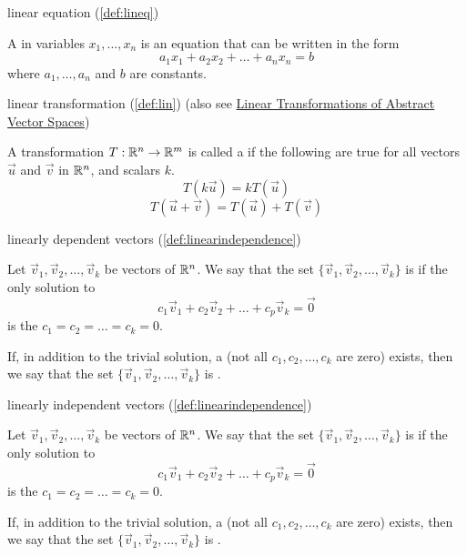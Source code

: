 \documentclass{ximera}
\begin{document}

linear equation (\ref{def:lineq})
\begin{expandable}
    A  in variables $x_1, \ldots, x_n$ is an equation that can be written in the form
$$a_1x_1+a_2x_2+\ldots +a_nx_n=b$$
where $a_1,\ldots ,a_n$ and $b$ are constants.
\end{expandable}

linear transformation (\ref{def:lin}) (also see \href{https://ximera.osu.edu/oerlinalg/LinearAlgebra/LTR-0022/main}{Linear Transformations of Abstract Vector Spaces})
\begin{expandable}
    A transformation $T:\mathbb{R}^n\rightarrow \mathbb{R}^m$ is called a  if the following are true for all vectors $\vec{u}$ and $\vec{v}$ in $\mathbb{R}^n$, and scalars $k$.
\begin{equation}
T(k\vec{u})= kT(\vec{u})
\end{equation}
\begin{equation}
T(\vec{u}+\vec{v})= T(\vec{u})+T(\vec{v})
\end{equation}
\end{expandable}

linearly dependent vectors (\ref{def:linearindependence})
\begin{expandable}
    Let $\vec{v}_1, \vec{v}_2,\ldots ,\vec{v}_k$ be vectors of $\mathbb{R}^n$.  We say that the set $\{\vec{v}_1, \vec{v}_2,\ldots ,\vec{v}_k\}$ is  if the only solution to 
\begin{equation}c_1\vec{v}_1+c_2\vec{v}_2+\ldots +c_p\vec{v}_k=\vec{0}\end{equation}
is the  $c_1=c_2=\ldots =c_k=0$.

If, in addition to the trivial solution, a  (not all $c_1, c_2,\ldots ,c_k$ are zero) exists, then we say that the set $\{\vec{v}_1, \vec{v}_2,\ldots ,\vec{v}_k\}$ is .
\end{expandable}

linearly independent vectors (\ref{def:linearindependence})
\begin{expandable}
    Let $\vec{v}_1, \vec{v}_2,\ldots ,\vec{v}_k$ be vectors of $\mathbb{R}^n$.  We say that the set $\{\vec{v}_1, \vec{v}_2,\ldots ,\vec{v}_k\}$ is  if the only solution to 
\begin{equation}c_1\vec{v}_1+c_2\vec{v}_2+\ldots +c_p\vec{v}_k=\vec{0}\end{equation}
is the  $c_1=c_2=\ldots =c_k=0$.

If, in addition to the trivial solution, a  (not all $c_1, c_2,\ldots ,c_k$ are zero) exists, then we say that the set $\{\vec{v}_1, \vec{v}_2,\ldots ,\vec{v}_k\}$ is .
\end{expandable}
\end{document}
